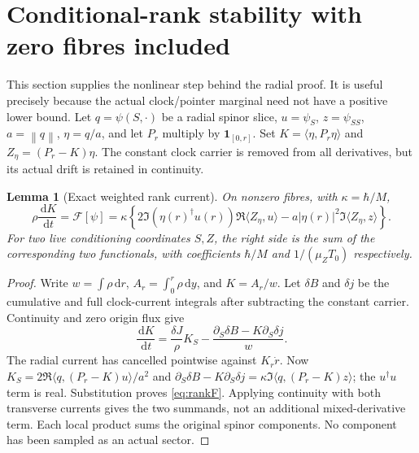 \documentclass[11pt]{article}
\newtheorem{lemma}[theorem]{Lemma}
\theoremstyle{definition}\newtheorem{definition}[theorem]{Definition}
\theoremstyle{remark}\newtheorem{remark}[theorem]{Remark}
\newcommand{\norm}[1]{\left\lVert#1\right\rVert}
\newcommand{\one}{\mathbf1}\newcommand{\R}{\mathbb R}\newcommand{\T}{\mathbb T}
\newcommand{\dd}{\,\mathrm d}\newcommand{\Imv}{\operatorname{Im}}\newcommand{\ii}{\mathrm i}
\begin{document}
\section{Conditional-rank stability with zero fibres included}\label{sec:rankproof}
This section supplies the nonlinear step behind the radial proof. It is
useful precisely because the actual clock/pointer marginal need not have a
positive lower bound. Let $q=\psi(S,\cdot)$ be a radial spinor slice,
$u=\psi_S$, $z=\psi_{SS}$, $a=\norm q$, $\eta=q/a$, and let
$P_r$ multiply by $\one_{[0,r]}$. Set $K=\langle\eta,P_r\eta\rangle$
and $Z_\eta=(P_r-K)\eta$. The constant clock carrier is removed from
all derivatives, but its actual drift is retained in continuity.

\begin{lemma}[Exact weighted rank current]\label{lem:rankcurrent}
On nonzero fibres, with $\kappa=\hbar/M$,
\begin{equation}\label{eq:rankF}
 \rho\frac{\dd K}{\dd t}=\mathcal F[\psi]
 =\kappa\left\{2\Im(\eta(r)^\dagger u(r))
          \Re\langle Z_\eta,u\rangle
       -a|\eta(r)|^2\Im\langle Z_\eta,z\rangle\right\}.
\end{equation}
For two live conditioning coordinates $S,Z$, the right side is the sum
of the corresponding two functionals, with coefficients $\hbar/M$ and
$1/(\mu_ZT_0)$ respectively.
\end{lemma}
\begin{proof}
Write $w=\int\rho\dd r$, $A_r=\int_0^r\rho\dd y$, and
$K=A_r/w$. Let $\delta B$ and $\delta j$ be the cumulative and full
clock-current integrals after subtracting the constant carrier. Continuity
and zero origin flux give
\[
 \frac{\dd K}{\dd t}
  =\frac{\delta J}{\rho}K_S
       -\frac{\partial_S\delta B-K\partial_S\delta j}{w}.
\]
The radial current has cancelled pointwise against $K_r\dot r$.
Now $K_S=2\Re\langle q,(P_r-K)u\rangle/a^2$ and
$\partial_S\delta B-K\partial_S\delta j
=\kappa\Im\langle q,(P_r-K)z\rangle$; the $u^\dagger u$ term
is real. Substitution proves \eqref{eq:rankF}. Applying continuity with
both transverse currents gives the two summands, not an additional
mixed-derivative term. Each local product sums the original spinor
components. No component has been sampled as an actual sector.
\end{proof}
\end{document}
